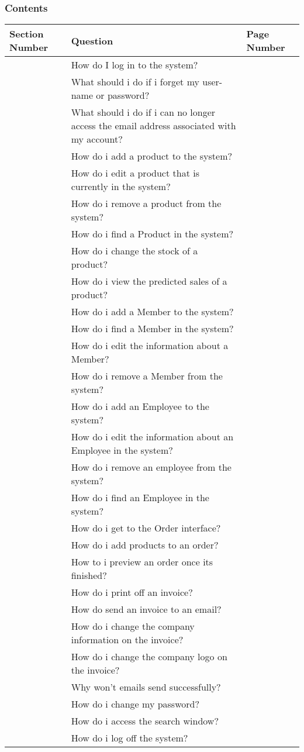 \pagebreak
\subsubsection{Contents}

\begin{center}
    \begin{longtable}{|p{3cm}|p{6cm}|p{3cm}|}
        \hline
	 \textbf{Section Number} & \textbf{Question} & \textbf{Page Number} \\ \hline
	&How do I log in to the system? & \\ \hline
	&What should i do if i forget my user-name or password?& \\ \hline
	& What should i do if i can no longer access the email address associated with my account? & \\ \hline
	&How do i add a product to the system? & \\ \hline
	&How do i edit a product that is currently in the system?& \\ \hline
	&How do i remove a product from the system?& \\ \hline
	&How do i find a Product in the system?& \\ \hline
	&How do i change the stock of a product?& \\ \hline
	&How do i view the predicted sales of a product?& \\ \hline
	&How do i add a Member to the system?& \\ \hline
	&How do i find a Member in the system?& \\ \hline
	&How do i edit the information about a Member?& \\ \hline
	&How do i remove a Member from the system?& \\ \hline
	&How do i add an Employee to the system?& \\ \hline
	&How do i edit the information about an Employee in the system?& \\ \hline
	&How do i remove an employee from the system?& \\ \hline
	&How do i find an Employee in the system?& \\ \hline
	&How do i get to the Order interface?& \\ \hline
	&How do i add products to an order?& \\ \hline
	&How to i preview an order once its finished?& \\ \hline
	&How do i print off an invoice?& \\ \hline
	&How do send an invoice to an email?& \\ \hline
	&How do i change the company information on the invoice? & \\ \hline
	&How do i change the company logo on the invoice?& \\ \hline
	&Why won't emails send successfully?& \\ \hline
	&How do i change my password?& \\ \hline
	&How do i access the search window?& \\ \hline
	&How do i log off the system?& \\ \hline
	\end{longtable}
\end{center}


